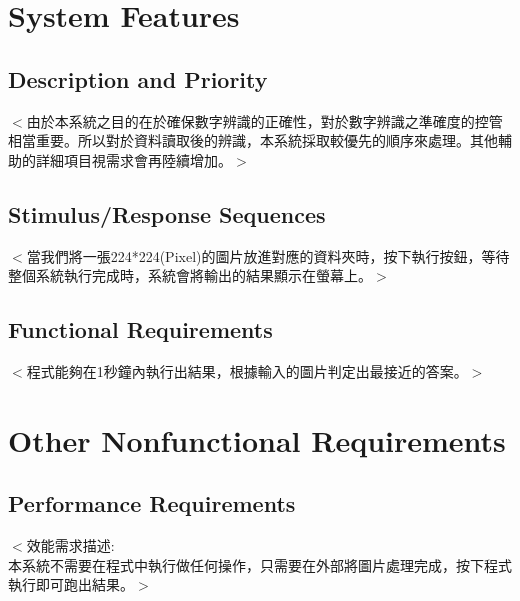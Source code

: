 \documentclass{scrreprt}
\begin{document}
\begin{CJK*}{UTF8}{bsmi}
\chapter{System Features}


\section{Description and Priority}
$<$由於本系統之目的在於確保數字辨識的正確性，對於數字辨識之準確度的控管相當重要。所以對於資料讀取後的辨識，本系統採取較優先的順序來處理。其他輔助的詳細項目視需求會再陸續增加。$>$

\section{Stimulus/Response Sequences}
$<$當我們將一張224*224(Pixel)的圖片放進對應的資料夾時，按下執行按鈕，等待整個系統執行完成時，系統會將輸出的結果顯示在螢幕上。$>$

\section{Functional Requirements}
$<$程式能夠在1秒鐘內執行出結果，根據輸入的圖片判定出最接近的答案。$>$



\chapter{Other Nonfunctional Requirements}

\section{Performance Requirements}
$<$效能需求描述:\\
  本系統不需要在程式中執行做任何操作，只需要在外部將圖片處理完成，按下程式執行即可跑出結果。$>$

\end{CJK*}
\end{document}
